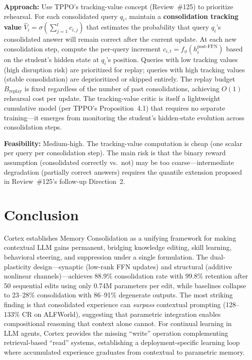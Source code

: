 \documentclass[11pt,a4paper]{article}
\begin{document}
\textbf{Approach:} Use TPPO's tracking-value concept (Review~\#125) to prioritize rehearsal. For each consolidated query $q_i$, maintain a \textbf{consolidation tracking value} $\hat{V}_i = \sigma(\sum_{j=1}^{t} c_{i,j})$ that estimates the probability that query $q_i$'s consolidated answer will remain correct after the current update. At each new consolidation step, compute the per-query increment $c_{i,t} = f_\phi(h_i^{\text{post-FFN}})$ based on the student's hidden state at $q_i$'s position. Queries with low tracking values (high disruption risk) are prioritized for replay; queries with high tracking values (stable consolidation) are deprioritized or skipped entirely. The replay budget $B_{\text{replay}}$ is fixed regardless of the number of past consolidations, achieving $O(1)$ rehearsal cost per update. The tracking-value critic is itself a lightweight cumulative model (per TPPO's Proposition~4.1) that requires no separate training---it emerges from monitoring the student's hidden-state evolution across consolidation steps.

\textbf{Feasibility:} Medium-high. The tracking-value computation is cheap (one scalar per query per consolidation step). The main risk is that the binary reward assumption (consolidated correctly vs.\ not) may be too coarse---intermediate degradation (partially correct answers) requires the quantile extension proposed in Review~\#125's follow-up Direction~2.

\section{Conclusion}
Cortex establishes Memory Consolidation as a unifying framework for making contextual LLM gains permanent, bridging knowledge editing, skill learning, behavioral steering, and suppression under a single formulation. The dual-plasticity design---synaptic (low-rank FFN updates) and structural (additive nonlinear channels)---achieves 88.9\% consolidation rate with 99.8\% retention after 50 sequential edits using only 0.74M parameters per edit, while baselines collapse to 23--28\% consolidation with 86--91\% degenerate outputs. The most striking finding is that consolidated experience can \emph{surpass} contextual prompting (128--133\% CR on ALFWorld), suggesting that parametric integration enables compositional reasoning that context alone cannot. For continual learning in LLM agents, Cortex provides the missing ``write'' operation complementing retrieval-based ``read'' systems, establishing a deployment-specific learning loop where accumulated experience graduates from contextual to parametric memory.
\end{document}
